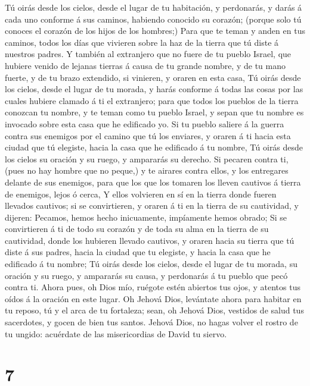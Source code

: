  Tú oirás desde los cielos, desde el lugar de tu
habitación, y perdonarás, y darás á cada uno conforme á sus caminos,
habiendo conocido su corazón; (porque solo tú conoces el corazón de los
hijos de los hombres;)  Para que te teman y anden en tus
caminos, todos los días que vivieren sobre la haz de la tierra que tú
diste á nuestros padres.  Y también al extranjero que no
fuere de tu pueblo Israel, que hubiere venido de lejanas tierras á causa
de tu grande nombre, y de tu mano fuerte, y de tu brazo extendido, si
vinieren, y oraren en esta casa,  Tú oirás desde los
cielos, desde el lugar de tu morada, y harás conforme á todas las cosas
por las cuales hubiere clamado á ti el extranjero; para que todos los
pueblos de la tierra conozcan tu nombre, y te teman como tu pueblo
Israel, y sepan que tu nombre es invocado sobre esta casa que he
edificado yo.  Si tu pueblo saliere á la guerra contra sus
enemigos por el camino que tú los enviares, y oraren á ti hacia esta
ciudad que tú elegiste, hacia la casa que he edificado á tu nombre,
 Tú oirás desde los cielos su oración y su ruego, y
ampararás su derecho.  Si pecaren contra ti, (pues no hay
hombre que no peque,) y te airares contra ellos, y los entregares
delante de sus enemigos, para que los que los tomaren los lleven
cautivos á tierra de enemigos, lejos ó cerca,  Y ellos
volvieren en sí en la tierra donde fueren llevados cautivos; si se
convirtieren, y oraren á ti en la tierra de su cautividad, y dijeren:
Pecamos, hemos hecho inicuamente, impíamente hemos obrado; 
Si se convirtieren á ti de todo su corazón y de toda su alma en la
tierra de su cautividad, donde los hubieren llevado cautivos, y oraren
hacia su tierra que tú diste á sus padres, hacia la ciudad que tu
elegiste, y hacia la casa que he edificado á tu nombre;  Tú
oirás desde los cielos, desde el lugar de tu morada, su oración y su
ruego, y ampararás su causa, y perdonarás á tu pueblo que pecó contra
ti.  Ahora pues, oh Dios mío, ruégote estén abiertos tus
ojos, y atentos tus oídos á la oración en este lugar.  Oh
Jehová Dios, levántate ahora para habitar en tu reposo, tú y el arca de
tu fortaleza; sean, oh Jehová Dios, vestidos de salud tus sacerdotes, y
gocen de bien tus santos.  Jehová Dios, no hagas volver el
rostro de tu ungido: acuérdate de las misericordias de David tu siervo.

\hypertarget{section-6}{%
\section{7}\label{section-6}}

